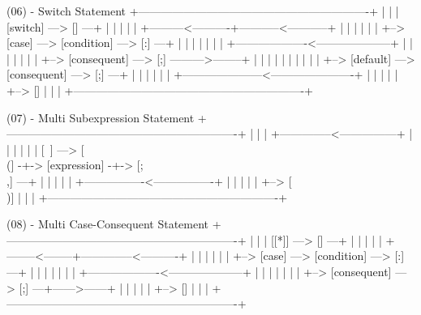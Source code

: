 {(06) - Switch Statement
+-------------------------------------------------------------+
|                                                             |
|   [switch] ---> [{] ---+                                    |
	|                        |                                    |
	|   +---------<----------+-----------<-----------+            |
	|   |                                            |            |
	|   +--> [case] ---> [condition] ---> [:] ---+   |            |
	|                                            |   |            |
	|   +-------------------<--------------------+   |            |
	|   |                                            |            |
	|   +--> [consequent] ---> [;] --------->--------+            |
	|   |                                            |            |
	|   |                                            |            |
	|   +--> [default] ---> [consequent] ---> [;] ---+            |
	|   |                                            |            |
	|   +---------------------<----------------------+            |
	|   |                                                         |
	|   +--> [}]                                                  |
|                                                             |
+-------------------------------------------------------------+


(07) - Multi Subexpression Statement
+-------------------------------------------------------------+
|                                                             |
|                   +--------------<---------------+          |
|                   |                              |          |
|   [~] ---> [{\\(] -+-> [expression] -+-> [;\\,] ---+          |
	|                                     |                       |
	|   +----------------<----------------+                       |
	|   |                                                         |
	|   +--> [}\\)]                                                |
|                                                             |
+-------------------------------------------------------------+


(08) - Multi Case-Consequent Statement
+-------------------------------------------------------------+
|                                                             |
|   [[*]] ---> [{] ---+                                       |
	|                     |                                       |
	|   +--------<--------+--------------<----------+             |
	|   |                                           |             |
	|   +--> [case] ---> [condition] ---> [:] ---+  |             |
	|                                            |  |             |
	|   +-------------------<--------------------+  |             |
	|   |                                           |             |
	|   +--> [consequent] ---> [;] ---+------>------+             |
	|                                 |                           |
	|                                 +--> [}]                    |
|                                                             |
+-------------------------------------------------------------+


}
